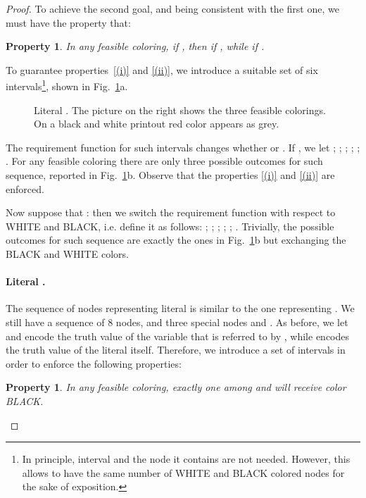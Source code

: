 \documentclass[a4paper,11pt]{article}
\theoremstyle{theorem}
\newtheorem{property}[theorem]{Property}
\begin{document}
\begin{proof}
\noindent To achieve the second goal, and being consistent with the first one, we must have the property that:

\begin{property}\label{(ii)}
In any feasible coloring, if , then  if , while  if . 
\end{property}

\noindent To guarantee properties~\eqref{(i)} and \eqref{(ii)}, we introduce a suitable set  of 
six intervals\footnote{In principle, interval  and the node it contains are not needed. However, this allows to have the same number of WHITE and BLACK colored nodes for the sake of exposition.}, shown in Fig.~\ref{fig:2}a. 

\begin{figure}[htb]
\centering
{} \hspace*{0.05 \textwidth}
\caption{Literal . The picture on the right shows the three feasible colorings. On a black and white 
printout red color appears as grey.}
\label{fig:2}
\end{figure}

\noindent The requirement function for such intervals changes whether  or . If , we let ; ; ; ; ;  . For any feasible coloring there are only three possible outcomes for such sequence, reported in Fig.~\ref{fig:2}b.
Observe that the properties \eqref{(i)} and \eqref{(ii)} are enforced.

Now suppose that :  then we switch the requirement function with respect to WHITE and BLACK, i.e. define it as follows: ; ; ; ; ;  .
Trivially, the possible outcomes for such sequence are exactly the ones in Fig.~\ref{fig:2}b but exchanging the BLACK and WHITE colors.
 
\paragraph{Literal .}  The sequence of nodes representing literal  is similar to the one representing .  We still have a sequence of 8 nodes, and three special nodes  and .
As before, we let  and  encode the truth value of the variable  that is referred to by , while  encodes the truth value of the literal  itself. Therefore, we introduce a set  of intervals in order to 
enforce the following properties:

\begin{property}\label{(iii)}
In any feasible coloring, exactly one among  and  will receive color BLACK. 
\end{property}


\end{proof}
\end{document}
